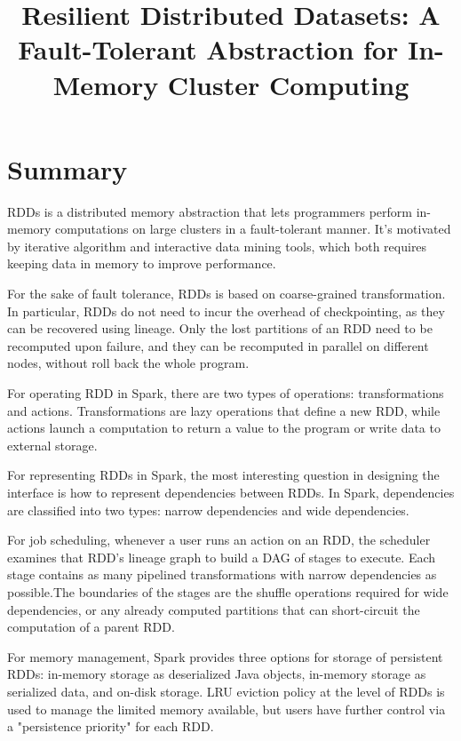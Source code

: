 \documentclass[conference]{IEEEtran}
\begin{document}
	
	\title{Resilient Distributed Datasets: A Fault-Tolerant Abstraction for
		In-Memory Cluster Computing}	
	\maketitle
	\IEEEpeerreviewmaketitle	
	\section{Summary}
	RDDs is a distributed memory abstraction that lets programmers perform in-memory computations on large clusters in a fault-tolerant manner. It's motivated by iterative algorithm and interactive data mining tools, which both requires keeping data in memory to improve performance.
	
	For the sake of fault tolerance, RDDs is based on coarse-grained transformation. In particular, RDDs do not need to incur the overhead of checkpointing, as they can be recovered using lineage. Only the lost partitions of an RDD need to be recomputed upon failure, and they can be recomputed in parallel on different nodes, without roll back the whole program.  
	
	For operating RDD in Spark, there are two types of operations: transformations and actions. Transformations are lazy operations that define a new RDD, while actions launch a computation to return a value to the program or write data to external storage.

	For representing RDDs in Spark, the most interesting question in designing the interface is how to represent dependencies between RDDs. In Spark, dependencies are classified into two types: narrow dependencies and wide dependencies. 
	
	For job scheduling, whenever a user runs an action on an RDD, the scheduler examines that RDD's lineage graph to build a DAG of stages to execute. Each stage contains as many pipelined transformations with narrow dependencies as possible.The boundaries of the stages are the shuffle operations required for wide dependencies, or any already computed partitions that can short-circuit the computation of a parent RDD.
	
	For memory management, Spark provides three options for storage of persistent RDDs: in-memory storage as deserialized Java objects, in-memory storage as serialized data, and on-disk storage. LRU eviction policy at the level of RDDs is used to manage the limited memory available, but users have further control via a "persistence priority" for each RDD.
\end{document}
